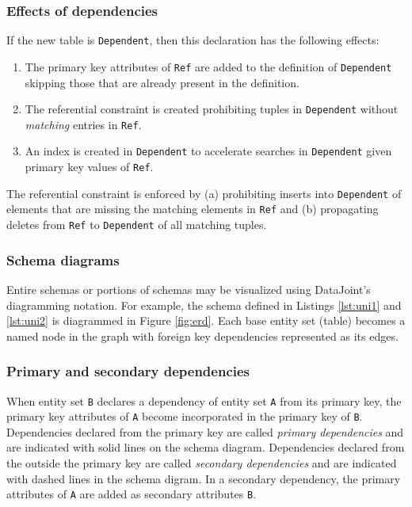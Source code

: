 \documentclass[letter,10pt]{article}
\begin{document}
\subsubsection{Effects of dependencies}\label{sec:effects}
If the new table is \lstinline$Dependent$, then this declaration has the following effects: 
\begin{enumerate}
\item The primary key attributes of \lstinline$Ref$ are added to the definition of \lstinline$Dependent$ skipping those that are already present in the definition.
\item The referential constraint is created prohibiting tuples in \lstinline$Dependent$ without \emph{matching} entries in \lstinline$Ref$.
\item An index is created in \lstinline$Dependent$ to accelerate searches in \lstinline$Dependent$ given primary key values of \lstinline$Ref$.
\end{enumerate}

The referential constraint is enforced by (a) prohibiting inserts into \lstinline$Dependent$ of elements that are missing the matching elements in \lstinline$Ref$ and (b) propagating deletes from \lstinline$Ref$ to \lstinline$Dependent$ of all matching tuples.

\subsubsection{Schema diagrams}\label{sec:diag}
Entire schemas or portions of schemas may be visualized using DataJoint's diagramming notation.  
For example, the schema defined in Listings \ref{lst:uni1} and \ref{lst:uni2} is diagrammed in Figure \ref{fig:erd}. 
Each base entity set (table) becomes a named node in the graph with foreign key dependencies represented as its edges. 

\subsubsection{Primary and secondary dependencies}
When entity set \lstinline$B$ declares a dependency of entity set \lstinline$A$ from its primary key, the primary key attributes of \lstinline$A$ become incorporated in the primary key of \lstinline$B$.  
Dependencies declared from the primary key are called \emph{primary dependencies} and are indicated with solid lines on the schema diagram. 
Dependencies declared from the outside the primary key are called \emph{secondary dependencies} and are indicated with dashed lines in the schema digram.  
In a secondary dependency, the primary attributes of \lstinline$A$ are added as secondary attributes \lstinline$B$. 
\end{document}
